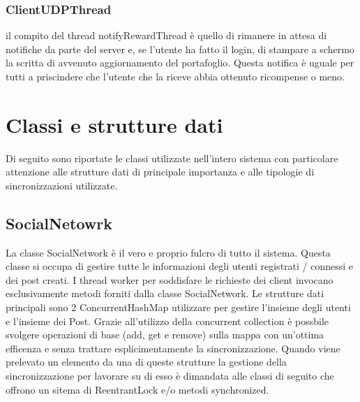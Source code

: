 \documentclass[11pt, a4paper, oneside]{article}
\begin{document}
\subsubsection{ClientUDPThread}
il compito del thread notifyRewardThread è quello di rimanere in attesa di notifiche da parte del server e, se l'utente ha fatto il login, di stampare
a schermo la scritta di avvenuto aggiornamento del portafoglio. Questa notifica è uguale per tutti a priscindere che l'utente che la riceve abbia ottenuto 
ricompense o meno.

\section{Classi e strutture dati}
Di seguito sono riportate le classi utilizzate nell'intero sistema con particolare attenzione alle strutture dati di principale importanza e alle tipologie di 
sincronizzazioni utilizzate.
\subsection{SocialNetowrk}
La classe SocialNetwork è il vero e proprio fulcro di tutto il sistema. Questa classe si occupa di gestire tutte le informazioni degli utenti registrati / connessi e
dei post creati. I thread worker per soddisfare le richieste dei client invocano esclusivamente metodi forniti dalla classe SocialNetwork.
Le strutture dati principali sono 2 ConcurrentHashMap utilizzare per gestire l'insieme degli utenti e l'insieme dei Post. Grazie all'utilizzo della concurrent collection
è possbile svolgere operazioni di base (add, get e remove) sulla mappa con un'ottima efficenza e senza trattare esplicimentamente la sincronizzazione. 
Quando viene prelevato un elemento da una di queste strutture la gestione della sincronizzazione per lavorare su di esso è dimandata alle classi di seguito che 
offrono un sitema di ReentrantLock e/o metodi synchronized. 
\end{document}
